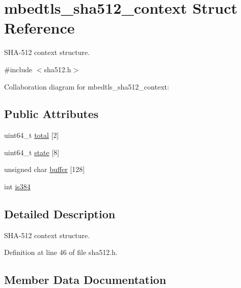 \hypertarget{structmbedtls__sha512__context}{}\section{mbedtls\+\_\+sha512\+\_\+context Struct Reference}
\label{structmbedtls__sha512__context}


S\+H\+A-\/512 context structure.  




{\ttfamily \#include $<$sha512.\+h$>$}



Collaboration diagram for mbedtls\+\_\+sha512\+\_\+context\+:
\subsection*{Public Attributes}
\begin{DoxyCompactItemize}
\item 
uint64\+\_\+t \mbox{\hyperlink{structmbedtls__sha512__context_a0c0c3f28093d6107c549d235bcd50726}{total}} \mbox{[}2\mbox{]}
\item 
uint64\+\_\+t \mbox{\hyperlink{structmbedtls__sha512__context_a9c7c627cf1904c576244eaca0c5d7928}{state}} \mbox{[}8\mbox{]}
\item 
unsigned char \mbox{\hyperlink{structmbedtls__sha512__context_a81d3accbf0fd1c5d5e1dfbabca0b15f8}{buffer}} \mbox{[}128\mbox{]}
\item 
int \mbox{\hyperlink{structmbedtls__sha512__context_a5061492d17d1a77471e61b0353db4e58}{is384}}
\end{DoxyCompactItemize}


\subsection{Detailed Description}
S\+H\+A-\/512 context structure. 

Definition at line 46 of file sha512.\+h.



\subsection{Member Data Documentation}
\mbox{\label{structmbedtls__sha512__context_a81d3accbf0fd1c5d5e1dfbabca0b15f8}} 
